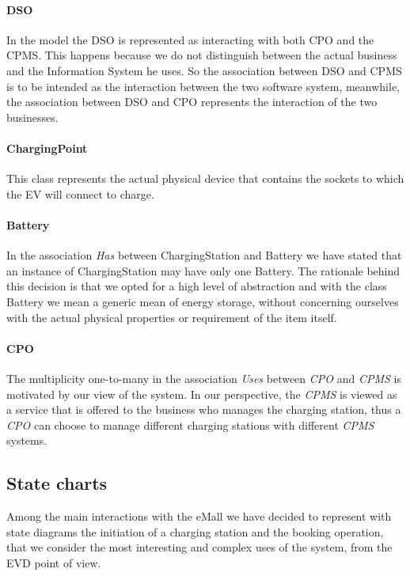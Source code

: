 \paragraph{DSO}
In the model the DSO is represented as interacting with both CPO and the CPMS. This happens because we do not distinguish between the actual business and the Information System he uses. So the association between DSO and CPMS is to be intended as the interaction between the two software system, meanwhile, the association between DSO and CPO represents the interaction of the two businesses.

\paragraph{ChargingPoint}
This class represents the actual physical device that contains the sockets to which the EV will connect to charge.

\paragraph{Battery} In the association \textit{Has} between ChargingStation and Battery we have stated that an instance of ChargingStation may have only one Battery. The rationale behind this decision is that we opted for a high level of abstraction and with the class Battery we mean a generic mean of energy storage, without concerning ourselves with the actual physical properties or requirement of the item itself.

\paragraph{CPO} The multiplicity one-to-many in the association \textit{Uses} between \textit{CPO} and \textit{CPMS} is motivated by our view of the system. In our perspective, the \textit{CPMS} is viewed as a service that is offered to the business who manages the charging station, thus a \textit{CPO} can choose to manage different charging stations with different \textit{CPMS} systems.

\subsection{State charts}
Among the main interactions with the eMall we have decided to represent with state diagrams the initiation of a charging station and the booking operation, that we consider the most interesting and complex uses of the system, from the EVD point of view.

